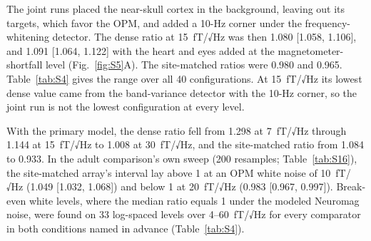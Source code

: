 \documentclass[preprint,12pt,authoryear,a4paper]{elsarticle}
\begin{document}
The joint runs placed the near-skull cortex in the background, leaving out its targets, which favor the OPM, and added a 10-Hz corner under the frequency-whitening detector. The dense ratio at 15~fT/√Hz was then 1.080 [1.058, 1.106], and 1.091 [1.064, 1.122] with the heart and eyes added at the magnetometer-shortfall level (Fig.~\ref{fig:S5}A). The site-matched ratios were 0.980 and 0.965. Table~\ref{tab:S4} gives the range over all 40 configurations. At 15~fT/√Hz its lowest dense value came from the band-variance detector with the 10-Hz corner, so the joint run is not the lowest configuration at every level.

With the primary model, the dense ratio fell from 1.298 at 7~fT/√Hz through 1.144 at 15~fT/√Hz to 1.008 at 30~fT/√Hz, and the site-matched ratio from 1.084 to 0.933. In the adult comparison's own sweep (200 resamples; Table~\ref{tab:S16}), the site-matched array's interval lay above 1 at an OPM white noise of 10~fT/√Hz (1.049 [1.032, 1.068]) and below 1 at 20~fT/√Hz (0.983 [0.967, 0.997]). Break-even white levels, where the median ratio equals 1 under the modeled Neuromag noise, were found on 33 log-spaced levels over 4–60~fT/√Hz for every comparator in both conditions named in advance (Table~\ref{tab:S4}).
\end{document}
